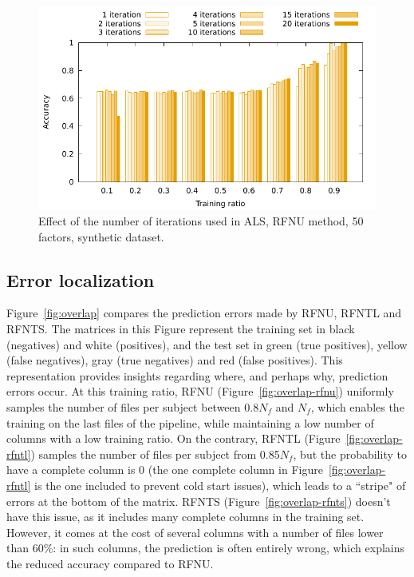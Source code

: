 \documentclass[10pt, conference, compsocconf]{IEEEtran}
\begin{document}
\begin{figure}[h]
\includegraphics[width=0.9\columnwidth]{data/results/means_of_results/ALS/Synthetic/8type-RFNU-Differ-Num-Iterations-rank50/ALS-8-types-iteration.pdf}
\caption{Effect of the number of iterations used in ALS, RFNU method, 50 factors, synthetic dataset.}
\label{fig:iterations}
\end{figure}

\subsection{Error localization}

Figure~\ref{fig:overlap} compares the prediction errors made by RFNU, 
RFNTL and RFNTS. The matrices in this Figure represent the training set 
in black (negatives) and white (positives), and the test set in green 
(true positives), yellow (false negatives), gray (true negatives) and 
red (false positives). This representation provides insights regarding 
where, and perhaps why, prediction errors 
occur. At this training ratio, RFNU (Figure~\ref{fig:overlap-rfnu}) 
uniformly samples the number of files per subject between 0.8$N_f$ and 
$N_f$, which enables the training on the last 
files of the pipeline, while maintaining a low number of columns with 
a low training ratio. On the contrary, RFNTL 
(Figure~\ref{fig:overlap-rfntl}) samples the number of files per 
subject from 0.85$N_f$, but the probability to have a complete column 
is 0 (the one complete column in Figure~\ref{fig:overlap-rfntl} is the 
one included to prevent cold start issues), which leads to a ``stripe" 
of errors at the bottom of the matrix. RFNTS 
(Figure~\ref{fig:overlap-rfnts}) doesn't have this issue, as it 
includes many complete columns in the training set. However, it comes at 
the cost of several columns with a number of files lower than 
60\%: in such columns, the prediction is often entirely wrong, which explains
the reduced accuracy compared to RFNU.
\end{document}
